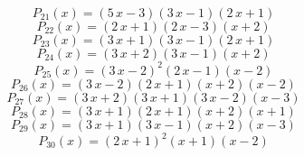 \subitem \begin{dmath*}P_{21}(x) = {\left(5 \, x - 3\right)} {\left(3 \, x - 1\right)} {\left(2 \, x + 1\right)} \end{dmath*}\vspace{- 1.20000000000000 cm}
\subitem \begin{dmath*}P_{22}(x) = {\left(2 \, x + 1\right)} {\left(2 \, x - 3\right)} {\left(x + 2\right)} \end{dmath*}\vspace{- 1.20000000000000 cm}
\subitem \begin{dmath*}P_{23}(x) = {\left(3 \, x + 1\right)} {\left(3 \, x - 1\right)} {\left(2 \, x + 1\right)} \end{dmath*}\vspace{- 1.20000000000000 cm}
\subitem \begin{dmath*}P_{24}(x) = {\left(3 \, x + 2\right)} {\left(3 \, x - 1\right)} {\left(x + 2\right)} \end{dmath*}\vspace{- 1.20000000000000 cm}
\subitem \begin{dmath*}P_{25}(x) = {\left(3 \, x - 2\right)}^{2} {\left(2 \, x - 1\right)} {\left(x - 2\right)} \end{dmath*}\vspace{- 1.20000000000000 cm}
\subitem \begin{dmath*}P_{26}(x) = {\left(3 \, x - 2\right)} {\left(2 \, x + 1\right)} {\left(x + 2\right)} {\left(x - 2\right)} \end{dmath*}\vspace{- 1.20000000000000 cm}
\subitem \begin{dmath*}P_{27}(x) = {\left(3 \, x + 2\right)} {\left(3 \, x + 1\right)} {\left(3 \, x - 2\right)} {\left(x - 3\right)} \end{dmath*}\vspace{- 1.20000000000000 cm}
\subitem \begin{dmath*}P_{28}(x) = {\left(3 \, x + 1\right)} {\left(2 \, x + 1\right)} {\left(x + 2\right)} {\left(x + 1\right)} \end{dmath*}\vspace{- 1.20000000000000 cm}
\subitem \begin{dmath*}P_{29}(x) = {\left(3 \, x + 1\right)} {\left(3 \, x - 1\right)} {\left(x + 2\right)} {\left(x - 3\right)} \end{dmath*}\vspace{- 1.20000000000000 cm}
\subitem \begin{dmath*}P_{30}(x) = {\left(2 \, x + 1\right)}^{2} {\left(x + 1\right)} {\left(x - 2\right)} \end{dmath*}\vspace{- 1.20000000000000 cm}
